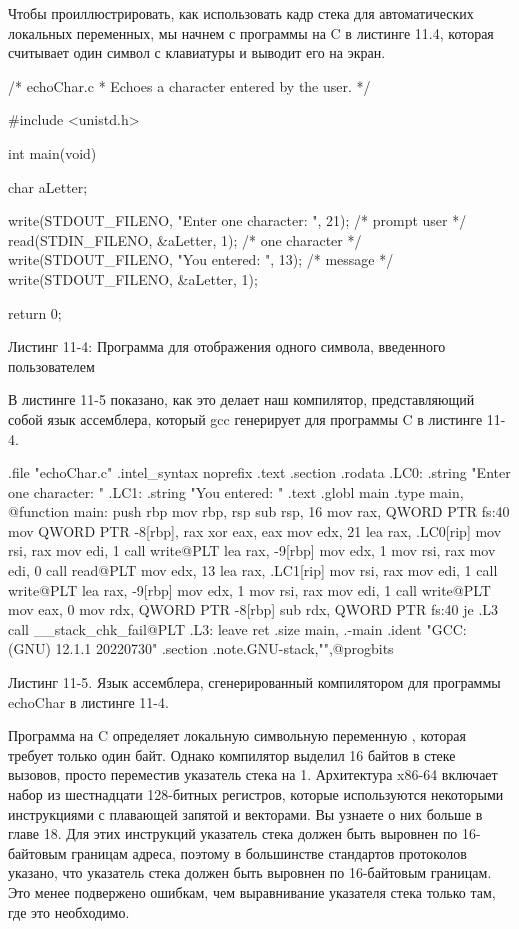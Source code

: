 Чтобы проиллюстрировать, как использовать кадр стека для автоматических локальных переменных, мы начнем с программы на C в листинге 11.4, которая считывает один символ с клавиатуры и выводит его на экран.

\begin{ffcode}
/* echoChar.c
 * Echoes a character entered by the user.
 */

#include <unistd.h>

int main(void)
{
  char aLetter;

  write(STDOUT_FILENO, "Enter one character: ", 21); /* prompt user   */
  read(STDIN_FILENO, &aLetter, 1);                   /* one character */
  write(STDOUT_FILENO, "You entered: ", 13);         /* message       */
  write(STDOUT_FILENO, &aLetter, 1);

  return 0;
}
\end{ffcode}

\begin{center}
Листинг 11-4: Программа для отображения одного символа, введенного пользователем    
\end{center}


В листинге 11-5 показано, как это делает наш компилятор, представляющий собой язык ассемблера, который gcc генерирует для программы C в листинге 11-4.

\begin{ffcode}
	.file	"echoChar.c"
	.intel_syntax noprefix
	.text
	.section	.rodata
.LC0:
	.string	"Enter one character: "
.LC1:
	.string	"You entered: "
	.text
	.globl	main
	.type	main, @function
main:
	push	rbp
	mov	rbp, rsp
	sub	rsp, 16
	mov	rax, QWORD PTR fs:40
	mov	QWORD PTR -8[rbp], rax
	xor	eax, eax
	mov	edx, 21
	lea	rax, .LC0[rip]
	mov	rsi, rax
	mov	edi, 1
	call	write@PLT
	lea	rax, -9[rbp]
	mov	edx, 1
	mov	rsi, rax
	mov	edi, 0
	call	read@PLT
	mov	edx, 13
	lea	rax, .LC1[rip]
	mov	rsi, rax
	mov	edi, 1
	call	write@PLT
	lea	rax, -9[rbp]
	mov	edx, 1
	mov	rsi, rax
	mov	edi, 1
	call	write@PLT
	mov	eax, 0
	mov	rdx, QWORD PTR -8[rbp]
	sub	rdx, QWORD PTR fs:40
	je	.L3
	call	__stack_chk_fail@PLT
.L3:
	leave
	ret
	.size	main, .-main
	.ident	"GCC: (GNU) 12.1.1 20220730"
	.section	.note.GNU-stack,"",@progbits
\end{ffcode}

\begin{center}
Листинг 11-5. Язык ассемблера, сгенерированный компилятором для программы echoChar в листинге 11-4.
\end{center}

Программа на C определяет локальную символьную переменную , которая требует только один байт. Однако компилятор выделил 16 байтов в стеке вызовов, просто переместив указатель стека на 1. Архитектура x86-64 включает набор из шестнадцати 128-битных регистров, которые используются некоторыми инструкциями с плавающей запятой и векторами. Вы узнаете о них больше в главе 18. Для этих инструкций указатель стека должен быть выровнен по 16-байтовым границам адреса, поэтому в большинстве стандартов протоколов указано, что указатель стека должен быть выровнен по 16-байтовым границам. Это менее подвержено ошибкам, чем выравнивание указателя стека только там, где это необходимо.

